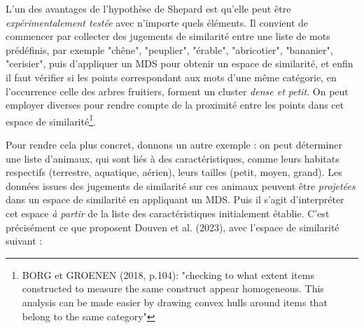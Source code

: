 \documentclass{article}
\begin{document}
\par
L’un des avantages de l’hypothèse de Shepard est qu’elle peut être \textit{expérimentalement testée} avec n’importe quels éléments. Il convient de commencer par collecter des jugements de similarité entre une liste de mots prédéfinis, par exemple "chêne", "peuplier", "érable", "abricotier", "bananier", "cerisier", puis d’appliquer un MDS pour obtenir un espace de similarité, et enfin il faut vérifier si les points correspondant aux mots d’une même catégorie, en l’occurrence celle des arbres fruitiers, forment un cluster \textit{dense et petit}. On peut employer diverses pour rendre compte de la proximité entre les points dans cet espace de similarité\footnote{BORG et GROENEN (2018, p.104): "checking to what extent items constructed to measure the same construct appear homogeneous. This analysis can be made easier by drawing convex hulls around items that belong to the same category"}.
\par
Pour rendre cela plus concret, donnons un autre exemple : on peut déterminer une liste d’animaux, qui sont liés à des caractéristiques, comme leurs habitats respectifs (terrestre, aquatique, aérien), leurs tailles (petit, moyen, grand). Les données issues des jugements de similarité sur ces animaux peuvent être \textit{projetées} dans un espace de similarité en appliquant un MDS. Puis il s’agit d’interpréter cet espace \textit{à partir} de la liste des caractéristiques initialement établie. C’est précisément ce que proposent Douven et al. (2023), avec l’espace de similarité suivant :
\end{document}
